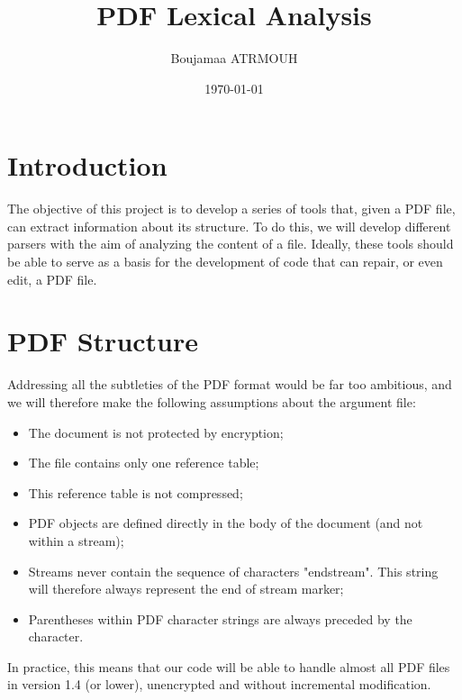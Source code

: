 \documentclass{article}
\title{PDF Lexical Analysis}
\author{Boujamaa ATRMOUH}
\date{\today}
\begin{document}
\maketitle

\section{Introduction}

\begin{flushleft}
    \hspace{1cm}The objective of this project is to develop a series of tools that, given a PDF file, can extract information about its structure. To do this, we will develop different parsers with the aim of analyzing the content of a file. Ideally, these tools should be able to serve as a basis for the development of code that can repair, or even edit, a PDF file.
\end{flushleft}

\section{PDF Structure}


\begin{flushleft}
    \hspace{1cm}Addressing all the subtleties of the PDF format would be far too ambitious, and we will therefore make the following assumptions about the argument file:
    \begin{itemize}
        \item The document is not protected by encryption;
        \item The file contains only one reference table;
        \item This reference table is not compressed;
        \item PDF objects are defined directly in the body of the document (and not within a stream);
        \item Streams never contain the sequence of characters "endstream". This string will therefore always represent the end of stream marker;
        \item Parentheses within PDF character strings are always preceded by the character.
    \end{itemize}
In practice, this means that our code will be able to handle almost all PDF files in version 1.4 (or lower), unencrypted and without incremental modification.
\end{flushleft}
\end{document}
